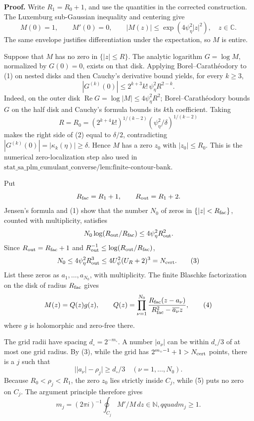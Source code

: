 \textbf{Proof.}
Write \(R_1=R_0+1\), and use the quantities in the corrected construction. The Luxemburg sub-Gaussian inequality and centering give
\[
 M(0)=1,\qquad M'(0)=0,\qquad
 |M(z)|\le \exp(4\psi_\eta^2|z|^2),\quad z\in\mathbb C. \tag{1}
\]
The same envelope justifies differentiation under the expectation, so \(M\) is entire.

Suppose that \(M\) has no zero in \(\{|z|\le R\}\). The analytic logarithm \(G=\log M\), normalized by \(G(0)=0\), exists on that disk. Applying Borel--Carath\'eodory to (1) on nested disks and then Cauchy's derivative bound yields, for every \(k\ge3\),
\[
 |G^{(k)}(0)|\le 2^{k+3}k!\,\psi_\eta^2R^{2-k}. \tag{2}
\]
Indeed, on the outer disk \(\operatorname{Re}G=\log|M|\le4\psi_\eta^2R^2\); Borel--Carath\'eodory bounds \(G\) on the half disk and Cauchy's formula bounds its \(k\)th coefficient. Taking
\[
 R=R_0=(2^{k+4}k!)^{1/(k-2)}
       (\psi_\eta^2/\delta)^{1/(k-2)}
\]
makes the right side of (2) equal to \(\delta/2\), contradicting \(|G^{(k)}(0)|=|\kappa_k(\eta)|\ge\delta\). Hence \(M\) has a zero \(z_0\) with \(|z_0|\le R_0\). This is the numerical zero-localization step also used in \(\text{stat\_sa\_plm\_cumulant\_converse/lem:finite-contour-bank}\).

Put
\[
 R_{\rm fac}=R_1+1,\qquad R_{\rm out}=R_1+2.
\]
Jensen's formula and (1) show that the number \(N_0\) of zeros in \(\{|z|<R_{\rm fac}\}\), counted with multiplicity, satisfies
\[
 N_0\log(R_{\rm out}/R_{\rm fac})
 \le4\psi_\eta^2R_{\rm out}^2.
\]
Since \(R_{\rm out}=R_{\rm fac}+1\) and \(R_{\rm out}^{-1}\le\log(R_{\rm out}/R_{\rm fac})\),
\[
 N_0\le4\psi_\eta^2R_{\rm out}^3
 \le4U_\psi^2(U_R+2)^3=N_{\rm cert}. \tag{3}
\]
List these zeros as \(a_1,\ldots,a_{N_0}\), with multiplicity. The finite Blaschke factorization on the disk of radius \(R_{\rm fac}\) gives
\[
 M(z)=Q(z)g(z),\qquad
 Q(z)=\prod_{\nu=1}^{N_0}
 \frac{R_{\rm fac}(z-a_\nu)}
 {R_{\rm fac}^2-\overline{a_\nu}z}, \tag{4}
\]
where \(g\) is holomorphic and zero-free there.

The grid radii have spacing \(d_\circ=2^{-m_\circ}\). A number \(|a_\nu|\) can be within \(d_\circ/3\) of at most one grid radius. By (3), while the grid has \(2^{m_\circ-1}+1>N_{\rm cert}\) points, there is a \(j\) such that
\[
 \bigl||a_\nu|-\rho_j\bigr|\ge d_\circ/3
 \quad(\nu=1,\ldots,N_0). \tag{5}
\]
Because \(R_0<\rho_j<R_1\), the zero \(z_0\) lies strictly inside \(C_j\), while (5) puts no zero on \(C_j\). The argument principle therefore gives
\[
 m_j=(2\pi i)^{-1}\oint_{C_j}M'/M\,dz\in\mathbb N,qquad m_j\ge1. \tag{6}
\]

